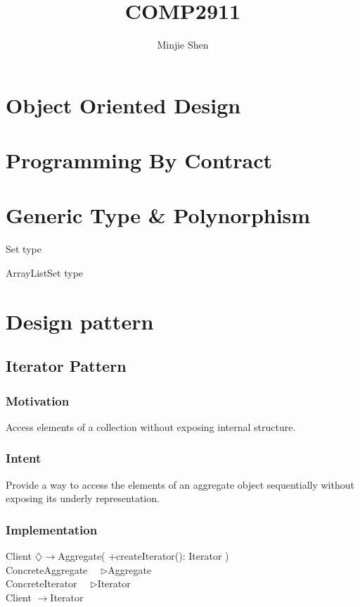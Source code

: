 \documentclass[a4paper]{scrartcl}
\title{COMP2911}
\author{Minjie Shen}
\newcommand{\aggregates}{$\diamondsuit\rightarrow $}
\newcommand{\implements}{\textendash ~\textendash ~\textendash$\triangleright$}
\newcommand{\uses}{$\longrightarrow$}
\begin{document}
  \maketitle
  \section{Object Oriented Design}
  \section{Programming By Contract}
  \section{Generic Type \& Polynorphism}
  
    Set type
    
    
    ArrayListSet type
    
    
  \section{Design pattern}
  
    \subsection { Iterator Pattern }
      \subsubsection {Motivation}
        Access elements of a collection without exposing internal structure.
      \subsubsection { Intent }
        Provide a way to access the elements of an aggregate object sequentially without exposing its underly representation.
      \subsubsection { Implementation }
        Client \aggregates Aggregate( +createIterator(): Iterator )\\
        ConcreteAggregate \implements Aggregate\\
        ConcreteIterator \implements Iterator\\
        Client \uses Iterator\\
        
        
\end{document}
